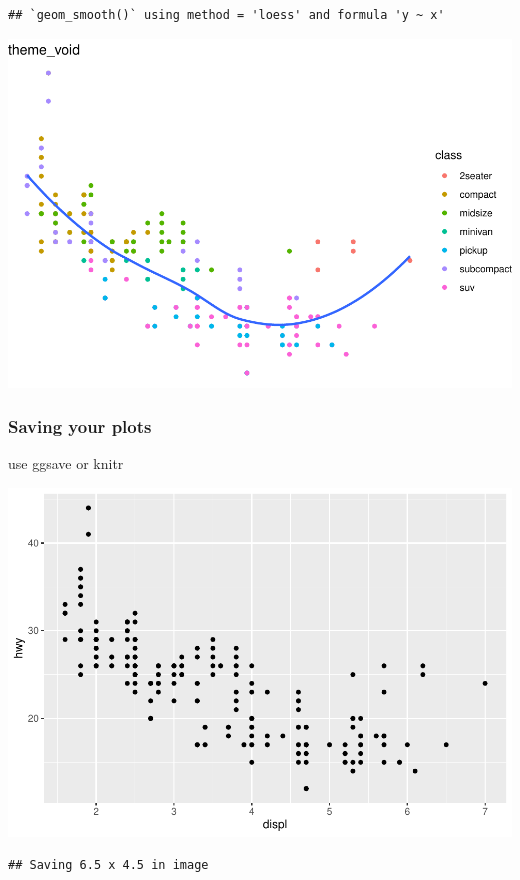 \documentclass[
]{article}
\begin{document}
\begin{verbatim}
## `geom_smooth()` using method = 'loess' and formula 'y ~ x'
\end{verbatim}

\includegraphics{rmarkdown_tutorial_files/figure-latex/unnamed-chunk-32-7.pdf}

\hypertarget{saving-your-plots}{%
\subsubsection{Saving your plots}\label{saving-your-plots}}

use ggsave or knitr

\includegraphics{rmarkdown_tutorial_files/figure-latex/unnamed-chunk-33-1.pdf}

\begin{verbatim}
## Saving 6.5 x 4.5 in image
\end{verbatim}
\end{document}

